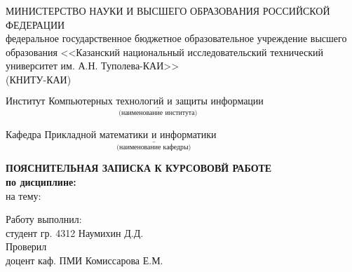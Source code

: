 \thispagestyle{titlePS}

\begin{center}
	\MakeUppercase{ Министерство науки и высшего образования российской федерации }\\
	федеральное государственное бюджетное образовательное учреждение высшего образования <<Казанский национальный исследовательский
	технический университет им. А.Н. Туполева-КАИ>>\\
	(КНИТУ-КАИ)
\end{center}

\(\underset{\text{(наименование института)}}{\underline{\text{Институт Компьютерных технологий и защиты информации}\hspace{2cm}}}\)

Кафедра \( \underset{\text{(наименование кафедры)}}{\underline{\text{Прикладной математики и информатики}\hspace{2cm}}} \)
\vspace{0pt plus2fill}
\begin{center}
	\textbf{\MakeUppercase{пояснительная записка к курсововй работе}}\\
	\textbf{по дисциплине: } \\
	на тему: \\
\end{center}
\vspace{0pt plus1fill}

\vspace{0pt plus2fill}
\hfill\parbox{9cm}{
	Работу выполнил: \\
	студент гр. 4312 Наумихин Д.Д. \vspace{1em} \\
	Проверил\\
	доцент каф. ПМИ Комиссарова Е.М.
}

\vspace{0pt plus2fill}

